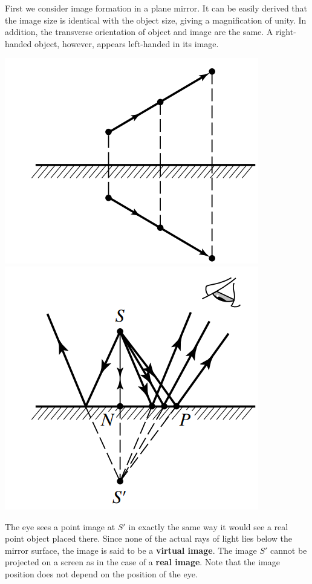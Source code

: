 \documentclass[11pt]{book}
\theoremstyle{break}
\theoremstyle{break}
\begin{document}
First we consider image formation in a plane mirror. It can be easily derived that the image size is identical with the object size, giving a magnification of unity. In addition, the transverse orientation of object and image are the same. A right-handed object, however, appears left-handed in its image.
\begin{center}
\includegraphics[scale=0.39]{mirrorIma1.png}\qquad\qquad\qquad \includegraphics[scale=0.39]{mirrorIma2.png}
\end{center}

The eye sees a point image at $S'$ in exactly the same way it would see a real point object placed there. Since none of the actual rays of light lies below the mirror surface, the image is said to be a \textbf{virtual image}. The image $S'$ cannot be projected on a screen as in the case of a \textbf{real image}. Note that the image position does not depend on the position of the eye.\\
\end{document}

